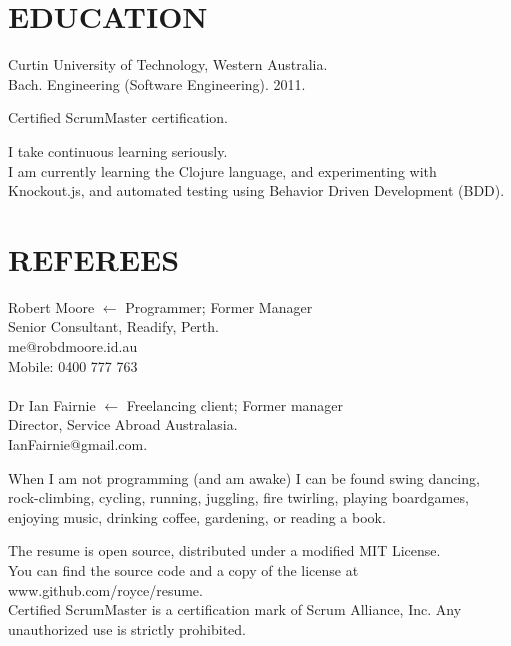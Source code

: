 \documentclass[margin]{res}
\begin{document}
\begin{resume}


  \section{EDUCATION}
  Curtin University of Technology, Western Australia. \\
  Bach. Engineering (Software Engineering). 2011.

  Certified ScrumMaster certification.

  I take continuous learning seriously.\\
  I am currently learning the Clojure language, and experimenting with Knockout.js, and automated testing using
  Behavior Driven Development (BDD).

  \section{REFEREES}
  Robert Moore
  \hfill $\longleftarrow$ Programmer; Former Manager\\
  Senior Consultant, Readify, Perth. \\
  me@robdmoore.id.au \\
  Mobile: 0400 777 763 \\
  \\
  Dr Ian Fairnie
  \hfill $\longleftarrow$ Freelancing client; Former manager\\
  Director, Service Abroad Australasia. \\
  IanFairnie@gmail.com. \\

\end{resume} 

\vfill
\centering

\hspace{-1.75in}  When I am not programming (and am awake) I can be found swing dancing, \\
\hspace{-1.75in}  rock-climbing, cycling, running, juggling, fire twirling, playing boardgames, \\
\hspace{-1.75in}  enjoying music, drinking coffee, gardening, or reading a book.

\vfill
\footnotesize
\hspace{-1.75in}  The resume is open source, distributed under a
                  modified MIT License. \\
\hspace{-1.75in}  You can find the source code and a copy of the license
                  at www.github.com/royce/resume.\\
\hspace{-1.75in}  Certified ScrumMaster is a certification mark of
                  Scrum Alliance, Inc. Any unauthorized use is strictly prohibited.
\vfill
\end{document}
